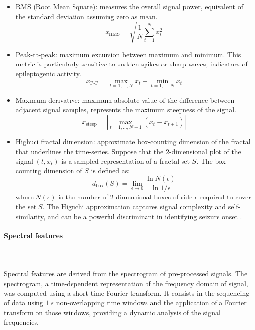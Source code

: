 \begin{itemize}
    \item RMS (Root Mean Square): measures the overall signal power, equivalent 
    of the standard deviation assuming zero as mean.
    \begin{equation}
        x_\text{RMS}=
        \sqrt{\frac{1}{N}\sum_{t=1}^N x_t^2}
    \end{equation}

    \item Peak-to-peak: maximum excursion between maximum and minimum.
    This metric is particularly sensitive to sudden spikes or sharp waves,
    indicators of epileptogenic activity.
    \begin{equation}
        x_\text{P-P} = \max_{t=1,...,N}{x_t} - \min_{t=1,...,N}{x_t}
    \end{equation}
     
    \item Maximum derivative: maximum absolute value of the difference between
    adjacent signal samples, represents the maximum steepness of the signal.
        \begin{equation}
        x_\text{steep} = \left|\max_{t=1,...,N-1}{(x_t - x_{t+1})}\right|
    \end{equation}
     
    \item Highuci fractal dimension: approximate box-counting dimension of the
    fractal that underlines the time-series.
    Suppose that the 2-dimensional plot of the signal $(t, x_t)$ is a sampled
    representation of a fractal set $S$.
    The box-counting dimension of $S$ is defined as:
    \begin{equation}
        d_\text{box}(S) = \lim_{\epsilon\to 0} \frac{\ln N(\epsilon)}
        {\ln 1/\epsilon}    
    \end{equation}
    where $N(\epsilon)$ is the number of 2-dimensional boxes of side $\epsilon$
    required to cover the set $S$.
    The Higuchi approximation \cite{higuchi-original} captures signal complexity 
    and self-similarity, and can be a powerful discriminant in identifying
    seizure onset \cite{higuchi}.
    

\end{itemize}


\paragraph{Spectral features}\label{meth:features:spectral}~\\
\\ 
Spectral features are derived from the spectrogram of pre-processed signals.
The spectrogram, a time-dependent representation of the frequency domain of
signal, was computed using a short-time Fourier transform.
It consists in the sequencing of data using $1\ s $ non-overlapping time windows
and the application of a Fourier transform on those windows, providing a dynamic
analysis of the signal frequencies.

